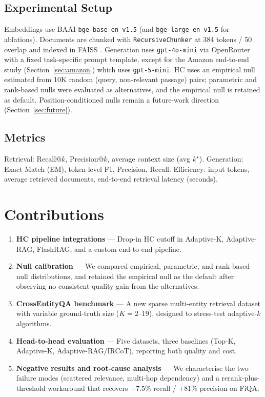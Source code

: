 \documentclass[letterpaper]{article}
\begin{document}
\subsection{Experimental Setup}
Embeddings use BAAI \texttt{bge-base-en-v1.5}
\cite{bgeembeddings2023} (and \texttt{bge-large-en-v1.5} for
ablations). Documents are chunked with \texttt{RecursiveChunker} at
384 tokens / 50 overlap and indexed in FAISS \cite{johnson2019faiss}.
Generation uses \texttt{gpt-4o-mini} via OpenRouter with a fixed
task-specific prompt template, except for the Amazon end-to-end
study (Section~\ref{sec:amazon}) which uses \texttt{gpt-5-mini}.
HC uses an empirical null estimated from 10K random (query,
non-relevant passage) pairs; parametric and rank-based nulls were
evaluated as alternatives, and the empirical null is retained as
default. Position-conditioned nulls remain a future-work direction
(Section~\ref{sec:future}).

\subsection{Metrics}
Retrieval: Recall@$k$, Precision@$k$, average context size (avg
$k^\star$). Generation: Exact Match (EM), token-level F1, Precision,
Recall. Efficiency: input tokens, average retrieved documents,
end-to-end retrieval latency (seconds).

\section{Contributions}

\begin{enumerate}
\item \textbf{HC pipeline integrations} --- Drop-in HC cutoff in
Adaptive-K, Adaptive-RAG, FlashRAG, and a custom end-to-end pipeline.
\item \textbf{Null calibration} --- We compared empirical,
parametric, and rank-based null distributions, and retained the
empirical null as the default after observing no consistent quality
gain from the alternatives.
\item \textbf{CrossEntityQA benchmark} --- A new sparse multi-entity
retrieval dataset with variable ground-truth size ($K = 2$--$19$),
designed to stress-test adaptive-$k$ algorithms.
\item \textbf{Head-to-head evaluation} --- Five datasets, three
baselines (Top-K, Adaptive-K, Adaptive-RAG/IRCoT), reporting both
quality and cost.
\item \textbf{Negative results and root-cause analysis} --- We
characterise the two failure modes (scattered relevance, multi-hop
dependency) and a rerank-plus-threshold workaround that recovers
$+7.5\%$ recall / $+81\%$ precision on FiQA.
\end{enumerate}
\end{document}
